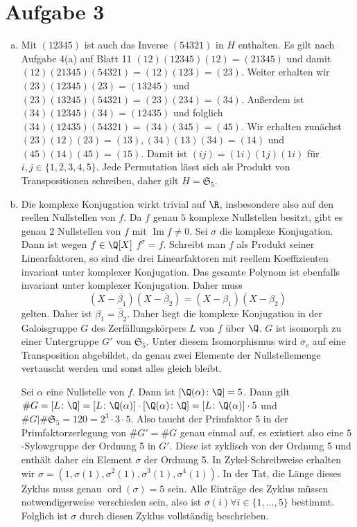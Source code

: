 \documentclass{article}
\begin{document}
\section*{Aufgabe 3}
\begin{enumerate}[(a)]
    \item Mit $(12345)$ ist auch das Inverse $(54321)$ in $H$ enthalten.
    Es gilt nach Aufgabe 4(a) auf Blatt 11 $(12)(12345)(12) = (21345)$ und damit $(12)(21345)(54321) = (12)(123) = (23)$.
    Weiter erhalten wir $(23)(12345)(23) = (13245)$ und $(23)(13245)(54321) = (23)(234) = (34)$.
    Außerdem ist $(34)(12345)(34) = (12435)$ und folglich $(34)(12435)(54321) = (34)(345) = (45)$.
    Wir erhalten zunächst $(23)(12)(23) = (13), (34)(13)(34) = (14)$ und $(45)(14)(45) = (15)$.
    Damit ist $(ij) = (1i)(1j)(1i)$ für $i, j \in \{1,2,3,4,5\}$.
    Jede Permutation lässt sich als Produkt von Transpositionen schreiben, daher gilt $H = \mathfrak{S}_5$.
    \item Die komplexe Konjugation wirkt trivial auf $\R$, insbesondere also auf den reellen Nullstellen von $f$.
    Da $f$ genau $5$ komplexe Nullstellen besitzt, gibt es genau 2 Nullstellen von $f$ mit $\operatorname{Im} f \neq 0$.
    Sei $\sigma$ die komplexe Konjugation. Dann ist wegen $f\in \Q[X]$ $f^\sigma = f$.
    Schreibt man $f$ als Produkt seiner Linearfaktoren, so sind die drei Linearfaktoren mit reellem Koeffizienten invariant
    unter komplexer Konjugation. Das gesamte Polynom ist ebenfalls invariant unter komplexer Konjugation.
    Daher muss 
    \[ 
        (X - \overline{\beta_1}) (X - \overline{\beta}_2) = (X - \beta_1)(X- \beta_2)
    \]
    gelten. Daher ist $\beta_1 = \overline{\beta}_2$. Daher liegt die komplexe Konjugation in der Galoisgruppe $G$ des 
    Zerfällungskörpers $L$ von $f$ über $\Q$.
    $G$ ist isomorph zu einer Untergruppe $G'$ von $\mathfrak{S}_5$. 
    Unter diesem Isomorphismus wird $\sigma_c$ auf eine Transposition abgebildet, da genau zwei Elemente der 
    Nullstellemenge vertauscht werden und sonst alles gleich bleibt.

    Sei $\alpha$ eine Nullstelle von $f$. Dann ist $[\Q(\alpha) \colon \Q] = 5$.
    Dann gilt $\# G = [L\colon \Q] = [L \colon \Q(\alpha)] \cdot [\Q(\alpha) \colon \Q] = [L \colon \Q(\alpha)] \cdot 5$ und
    $\# G | \# \mathfrak{S}_5 = 120 = 2^3 \cdot 3 \cdot 5$.
    Also taucht der Primfaktor 5 in der Primfaktorzerlegung von $\# G' = \# G$ genau einmal auf, es existiert also eine
    $5$-Sylowgruppe der Ordnung 5 in $G'$. Diese ist zyklisch von der Ordnung 5 und enthält daher ein Element $\sigma$ der Ordnung 5.
    In Zykel-Schreibweise erhalten wir $\sigma = (1,\sigma(1),\sigma^2(1), \sigma^3(1), \sigma^4(1))$. In der Tat,
    die Länge dieses Zyklus muss genau $\operatorname{ord}(\sigma) = 5$ sein. Alle Einträge des Zyklus müssen notwendigerweise
    verschieden sein, also ist $\sigma(i) \forall i \in \{1,\dots, 5\}$ bestimmt. Folglich ist $\sigma$ durch diesen Zyklus
    vollständig beschrieben.


\end{enumerate}
\end{document}
